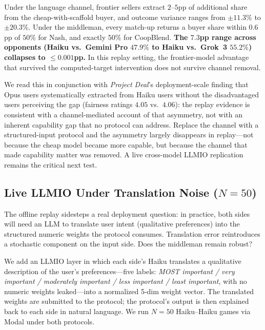\documentclass[11pt,a4paper]{article}
\begin{document}
Under the language channel, frontier sellers extract $2$--$5$pp of additional share from the cheap-with-scaffold buyer, and outcome variance ranges from $\pm 11.3\%$ to $\pm 20.3\%$. Under the middleman, every match-up returns a buyer share within $0.6$pp of $50\%$ for Nash, and exactly $50\%$ for CoopBlend. \textbf{The $7.3$pp range across opponents (Haiku vs.\ Gemini Pro $47.9\%$ to Haiku vs.\ Grok~3 $55.2\%$) collapses to $\le 0.001$pp.} In this replay setting, the frontier-model advantage that survived the computed-target intervention does not survive channel removal.

We read this in conjunction with \emph{Project Deal}'s deployment-scale finding that Opus users systematically extracted from Haiku users without the disadvantaged users perceiving the gap (fairness ratings $4.05$ vs.\ $4.06$): the replay evidence is consistent with a channel-mediated account of that asymmetry, not with an inherent capability gap that no protocol can address. Replace the channel with a structured-input protocol and the asymmetry largely disappears in replay---not because the cheap model became more capable, but because the channel that made capability matter was removed. A live cross-model LLMIO replication remains the critical next test.

\subsection{\texorpdfstring{Live LLMIO Under Translation Noise ($N = 50$)}{Live LLMIO Under Translation Noise (N = 50)}}
\label{sec:llmio_live}
\label{sec:middleman_llmio}

The offline replay sidesteps a real deployment question: in practice, both sides will need an LLM to translate user intent (qualitative preferences) into the structured numeric weights the protocol consumes. Translation error reintroduces a stochastic component on the input side. Does the middleman remain robust?

We add an LLMIO layer in which each side's Haiku translates a qualitative description of the user's preferences---five labels: \emph{MOST important / very important / moderately important / less important / least important}, with no numeric weights leaked---into a normalized 5-dim weight vector. The translated weights are submitted to the protocol; the protocol's output is then explained back to each side in natural language. We run $N = 50$ Haiku--Haiku games via Modal under both protocols.
\end{document}

